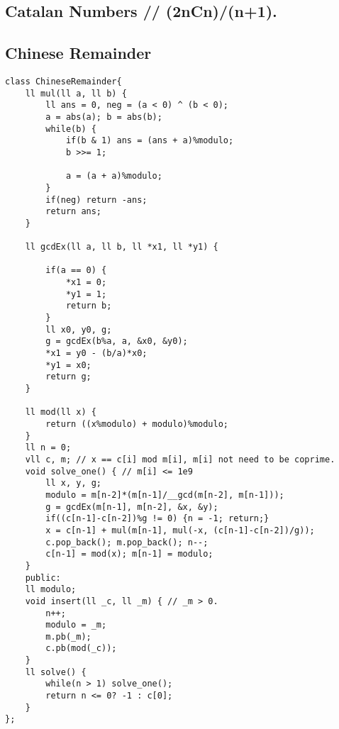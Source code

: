 \documentclass[a4paper]{article}
\begin{document}
\subsection*{Catalan Numbers // (2nCn)/(n+1).}
\subsection*{Chinese Remainder}
\begin{multicols}{2}
\begin{verbatim}
class ChineseRemainder{
    ll mul(ll a, ll b) {
        ll ans = 0, neg = (a < 0) ^ (b < 0);
        a = abs(a); b = abs(b);
        while(b) {
            if(b & 1) ans = (ans + a)%modulo;
            b >>= 1;
            
            a = (a + a)%modulo;
        }
        if(neg) return -ans;
        return ans;
    }
    
    ll gcdEx(ll a, ll b, ll *x1, ll *y1) {
    
        if(a == 0) {
            *x1 = 0;
            *y1 = 1;
            return b;
        }
        ll x0, y0, g;
        g = gcdEx(b%a, a, &x0, &y0);
        *x1 = y0 - (b/a)*x0;
        *y1 = x0;
        return g;
    }
    
    ll mod(ll x) {
        return ((x%modulo) + modulo)%modulo;
    }
    ll n = 0;
    vll c, m; // x == c[i] mod m[i], m[i] not need to be coprime.
    void solve_one() { // m[i] <= 1e9
        ll x, y, g;
        modulo = m[n-2]*(m[n-1]/__gcd(m[n-2], m[n-1]));
        g = gcdEx(m[n-1], m[n-2], &x, &y);
        if((c[n-1]-c[n-2])%g != 0) {n = -1; return;}
        x = c[n-1] + mul(m[n-1], mul(-x, (c[n-1]-c[n-2])/g));
        c.pop_back(); m.pop_back(); n--;
        c[n-1] = mod(x); m[n-1] = modulo;
    }
    public:
    ll modulo;
    void insert(ll _c, ll _m) { // _m > 0.
        n++;
        modulo = _m;
        m.pb(_m);
        c.pb(mod(_c));
    }
    ll solve() {
        while(n > 1) solve_one();
        return n <= 0? -1 : c[0];
    }
};
\end{verbatim}
\end{multicols}
\end{document}
